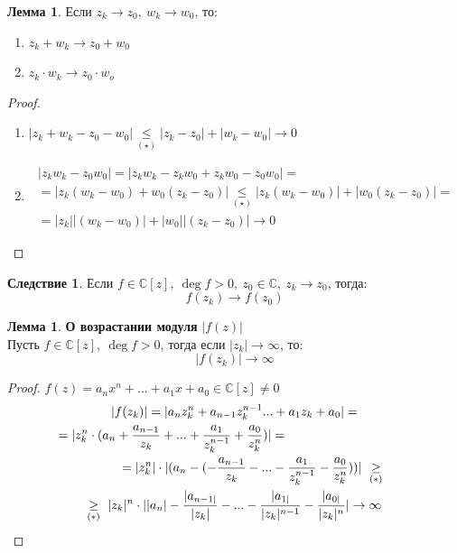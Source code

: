 \documentclass[a4paper, 12pt]{article}
\newcommand\tab[1][.5cm]{\hspace*{#1}}
\newcounter{lemcount}
\newcounter{lemcount2}
\theoremstyle{definition}
\newtheorem*{consequense}{Следствие}
\newtheorem{lemmanum}[lemcount]{Лемма}
\begin{document}
  \begin{lemmanum}
    Если $z_k \to z_0, \ w_k \to w_0$, то:
    \begin{enumerate}
      \item $z_k + w_k \to z_0 + w_0$
      \item $z_k \cdot w_k \to z_0 \cdot w_o$  
    \end{enumerate}
  \end{lemmanum} 
  \begin{proof}\tab
    \begin{enumerate}
      \item $|z_k+w_k-z_0-w_0| \underset{(\star)}{\leq} |z_k - z_0| + |w_k - w_0| \to 0$
      \item 
      \begin{multline*}
        |z_k w_k-z_0w_0| = |z_k w_k-z_kw_0 + z_k w_0-z_0w_0 | =\\
        = |z_k(w_k - w_0) + w_0(z_k - z_0)| \underset{(\star)}{\leq}  |z_k(w_k - w_0)| + |w_0(z_k - z_0)| =\\
        = |z_k||(w_k - w_0)| + |w_0||(z_k - z_0)| \to 0
      \end{multline*}
    \end{enumerate}
  \end{proof} 
  \begin{consequense}
    Если $f \in \mathbb{C}[z], \ \deg f >0, \ z_0 \in \mathbb{C}, \ z_k \to z_0$, тогда: 
    $$f(z_k) \to f(z_0)$$  
  \end{consequense}
  \begin{lemmanum} \textbf{О возрастании модуля} $|f(z)|$ \\
    Пусть $f \in \mathbb{C}[z], \ \deg f >0$, тогда если $|z_k| \to \infty$, то:
    $$|f(z_k)| \to \infty$$        
  \end{lemmanum} 
  \begin{proof}
    $f(z) = a_nx^n + ... + a_1x+a_0 \in \mathbb{C}[z] \neq 0$
    \begin{multline*}
      |f(z_k)| = |a_nz_k^n + a_{n-1}z_k^{n-1}... + a_1z_k+a_0| =\\
      \tab[-3.5cm]= |z_k^n \cdot (a_n+\frac{a_{n-1}}{z_k} + ... + \frac{a_{1}}{z_k^{n-1}} + \frac{a_{0}}{z_k^{n}})|=\\
      \tab[1cm]= |z_k^n| \cdot |(a_n - (-\frac{a_{n-1}}{z_k} - ... - \frac{a_{1}}{z_k^{n-1}} - \frac{a_{0}}{z_k^{n}}))| \ \underset{(*)}{\geq}\\
      \underset{(*)}{\geq} \ |z_k|^n \cdot ||a_n|-\frac{|a_{n-1|}}{|z_k|} - ... - \frac{|a_{1|}}{|z_k|^{n-1}} - \frac{|a_{0|}}{|z_k|^{n}}| \to \infty
    \end{multline*} 
  \end{proof} 
\end{document}
